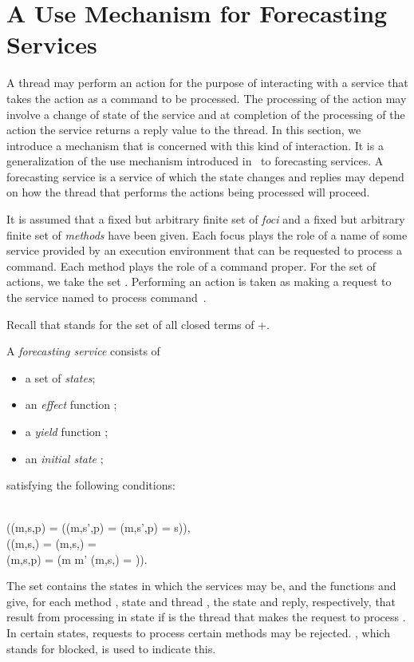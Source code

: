 \documentclass[fleqn]{llncs}
\begin{document}
\section{A Use Mechanism for Forecasting Services}
\label{sect-TSI}

A thread may perform an action for the purpose of interacting with a
service that takes the action as a command to be processed.
The processing of the action may involve a change of state of the
service and at completion of the processing of the action the service
returns a reply value to the thread.
In this section, we introduce a mechanism that is concerned with this
kind of interaction.
It is a generalization of the use mechanism introduced in~\cite{BM08d}
to forecasting services.
A forecasting service is a service of which the state changes and
replies may depend on how the thread that performs the actions being
processed will proceed.

It is assumed that a fixed but arbitrary finite set  of
\emph{foci} and a fixed but arbitrary finite set  of
\emph{methods} have been given.
Each focus plays the role of a name of some service provided by an
execution environment that can be requested to process a command.
Each method plays the role of a command proper.
For the set  of actions, we take the set
.
Performing an action  is taken as making a request to the
service named  to process command~.

Recall that  stands for the set of all closed terms of \BTA+\REC.

A \emph{forecasting service}  consists of
\begin{itemize}
\item
a set  of \emph{states};
\item
an \emph{effect} function ;
\item
a \emph{yield} function
;
\item
an \emph{initial state} ;
\end{itemize}
satisfying the following conditions:
\begin{ldispl}
 {}
\\ \quad
(\yld(m,s,p) = \Blocked \land
  {(\yld(m,s',p) = \Blocked \limpl \eff(m,s',p) = s)})\;,
\eqnsep
{}
\\ \quad
 (\yld(m,s,\Stop) = \Blocked \land
  \yld(m,s,\DeadEnd) = \Blocked \land {}
\\ \quad \phantom{(}
  \yld(m,s,\Tau \bapf p) = \Blocked \land
  (m \neq m' \limpl
   \yld(m,s,) = \Blocked))\;.
\end{ldispl}The set  contains the states in which the services may be, and the
functions  and  give, for each method , state  and
thread , the state and reply, respectively, that result from
processing  in state  if  is the thread that makes the request
to process .
In certain states, requests to process certain methods may be rejected.
, which stands for blocked, is used to indicate this.
\end{document}
